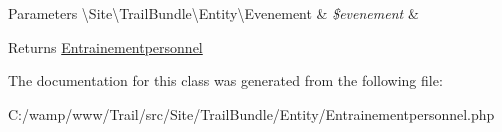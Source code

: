 \begin{DoxyParams}[1]{Parameters}
\textbackslash{}\+Site\textbackslash{}\+Trail\+Bundle\textbackslash{}\+Entity\textbackslash{}\+Evenement & {\em \$evenement} & \\
\hline
\end{DoxyParams}
\begin{DoxyReturn}{Returns}
\hyperlink{class_site_1_1_trail_bundle_1_1_entity_1_1_entrainementpersonnel}{Entrainementpersonnel} 
\end{DoxyReturn}


The documentation for this class was generated from the following file\+:\begin{DoxyCompactItemize}
\item 
C\+:/wamp/www/\+Trail/src/\+Site/\+Trail\+Bundle/\+Entity/Entrainementpersonnel.\+php\end{DoxyCompactItemize}
